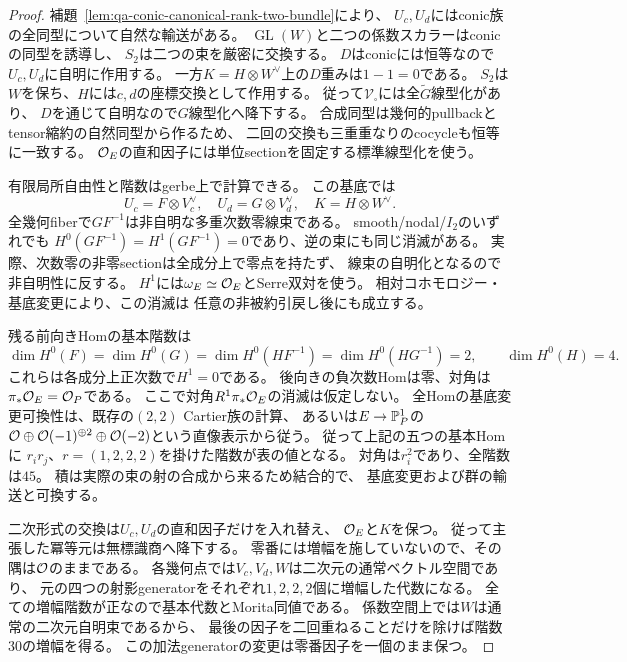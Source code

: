 \begin{proof}
補題~\ref{lem:qa-conic-canonical-rank-two-bundle}により、
$U_c,U_d$にはconic族の全同型について自然な輸送がある。
$\operatorname{GL}(W)$と二つの係数スカラーはconicの同型を誘導し、
$S_2$は二つの束を厳密に交換する。
$D$はconicには恒等なので$U_c,U_d$に自明に作用する。
一方$K=H\otimes W^\vee$上の$D$重みは$1-1=0$である。
$S_2$は$W$を保ち、$H$には$c,d$の座標交換として作用する。
従って$\mathcal V_\square$には全$\widetilde G$線型化があり、
$D$を通じて自明なので$G$線型化へ降下する。
合成同型は幾何的pullbackとtensor縮約の自然同型から作るため、
二回の交換も三重重なりのcocycleも恒等に一致する。
$\mathcal O_E$の直和因子には単位sectionを固定する標準線型化を使う。

有限局所自由性と階数はgerbe上で計算できる。
この基底では
\[
 U_c=F\otimes V_c^\vee,
 \quad U_d=G\otimes V_d^\vee,
 \quad K=H\otimes W^\vee.
\]
全幾何fiberで$GF^{-1}$は非自明な多重次数零線束である。
smooth/nodal/$I_2$のいずれでも
$H^0(GF^{-1})=H^1(GF^{-1})=0$であり、逆の束にも同じ消滅がある。
実際、次数零の非零sectionは全成分上で零点を持たず、
線束の自明化となるので非自明性に反する。
$H^1$には$\omega_E\simeq\mathcal O_E$とSerre双対を使う。
相対コホモロジー・基底変更により、この消滅は
任意の非被約引戻し後にも成立する。

残る前向きHomの基本階数は
\[
 \dim H^0(F)=\dim H^0(G)
 =\dim H^0(HF^{-1})=\dim H^0(HG^{-1})=2,
 \qquad\dim H^0(H)=4.
\]
これらは各成分上正次数で$H^1=0$である。
後向きの負次数Homは零、対角は$\pi_*\mathcal O_E=\mathcal O_P$である。
ここで対角$R^1\pi_*\mathcal O_E$の消滅は仮定しない。
全Homの基底変更可換性は、既存の$(2,2)$ Cartier族の計算、
あるいは$E\to\mathbb P^1_P$の
$\mathcal O\oplus\mathcal O(-1)^{\oplus2}\oplus\mathcal O(-2)$という直像表示から従う。
従って上記の五つの基本Homに
$r_ir_j$、$r=(1,2,2,2)$を掛けた階数が表の値となる。
対角は$r_i^2$であり、全階数は$45$。
積は実際の束の射の合成から来るため結合的で、
基底変更および群の輸送と可換する。

二次形式の交換は$U_c,U_d$の直和因子だけを入れ替え、
$\mathcal O_E$と$K$を保つ。
従って主張した冪等元は無標識商へ降下する。
零番には増幅を施していないので、その隅は$\mathcal O$のままである。
各幾何点では$V_c,V_d,W$は二次元の通常ベクトル空間であり、
元の四つの射影generatorをそれぞれ$1,2,2,2$個に増幅した代数になる。
全ての増幅階数が正なので基本代数とMorita同値である。
係数空間上では$W$は通常の二次元自明束であるから、
最後の因子を二回重ねることだけを除けば階数$30$の増幅を得る。
この加法generatorの変更は零番因子を一個のまま保つ。
\end{proof}

